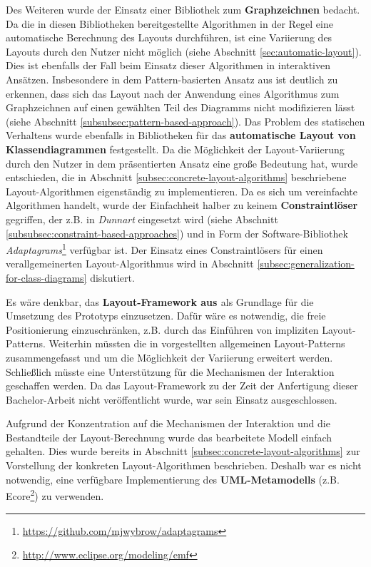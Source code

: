 Des Weiteren wurde der Einsatz einer Bibliothek zum \textbf{Graphzeichnen} bedacht. Da die in diesen Bibliotheken bereitgestellte Algorithmen in der Regel eine automatische Berechnung des Layouts durchführen, ist eine Variierung des Layouts durch den Nutzer nicht möglich (siehe Abschnitt \ref{sec:automatic-layout}). Dies ist ebenfalls der Fall beim Einsatz dieser Algorithmen in interaktiven Ansätzen. Insbesondere in dem Pattern-basierten Ansatz aus \cite{Maier12A-Pattern-based} ist deutlich zu erkennen, dass sich das Layout nach der Anwendung eines Algorithmus zum Graphzeichnen auf einen gewählten Teil des Diagramms nicht modifizieren lässt (siehe Abschnitt \ref{subsubsec:pattern-based-approach}). Das Problem des statischen Verhaltens wurde ebenfalls in Bibliotheken für das \textbf{automatische Layout von Klassendiagrammen} festgestellt. Da die Möglichkeit der Layout-Variierung durch den Nutzer in dem präsentierten Ansatz eine große Bedeutung hat, wurde entschieden, die in Abschnitt \ref{subsec:concrete-layout-algorithms} beschriebene Layout-Algorithmen eigenständig zu implementieren. Da es sich um vereinfachte Algorithmen handelt, wurde der Einfachheit halber zu keinem \textbf{Constraintlöser} gegriffen, der z.B. in \textit{Dunnart} eingesetzt wird (siehe Abschnitt \ref{subsubsec:constraint-based-approaches}) und in Form der Software-Bibliothek \textit{Adaptagrams}\footnote{\url{https://github.com/mjwybrow/adaptagrams}} verfügbar ist. Der Einsatz eines Constraintlösers für einen verallgemeinerten Layout-Algorithmus wird in Abschnitt \ref{subsec:generalization-for-class-diagrams} diskutiert.

Es wäre denkbar, das \textbf{Layout-Framework aus \cite{Maier12A-Pattern-based}} als Grundlage für die Umsetzung des Prototyps einzusetzen. Dafür wäre es notwendig, die freie Positionierung einzuschränken, z.B. durch das Einführen von impliziten Layout-Patterns. Weiterhin müssten die in \cite{Maier12A-Pattern-based} vorgestellten allgemeinen Layout-Patterns zusammengefasst und um die Möglichkeit der Variierung erweitert werden. Schließlich müsste eine Unterstützung für die Mechanismen der Interaktion geschaffen werden. Da das Layout-Framework zu der Zeit der Anfertigung dieser Bachelor-Arbeit nicht veröffentlicht wurde, war sein Einsatz ausgeschlossen.

Aufgrund der Konzentration auf die Mechanismen der Interaktion und die Bestandteile der Layout-Berechnung wurde das bearbeitete Modell einfach gehalten. Dies wurde bereits in Abschnitt \ref{subsec:concrete-layout-algorithms} zur Vorstellung der konkreten Layout-Algorithmen beschrieben. Deshalb war es nicht notwendig, eine verfügbare Implementierung des \textbf{UML-Metamodells} (z.B. Ecore\footnote{\url{http://www.eclipse.org/modeling/emf}}) zu verwenden.

